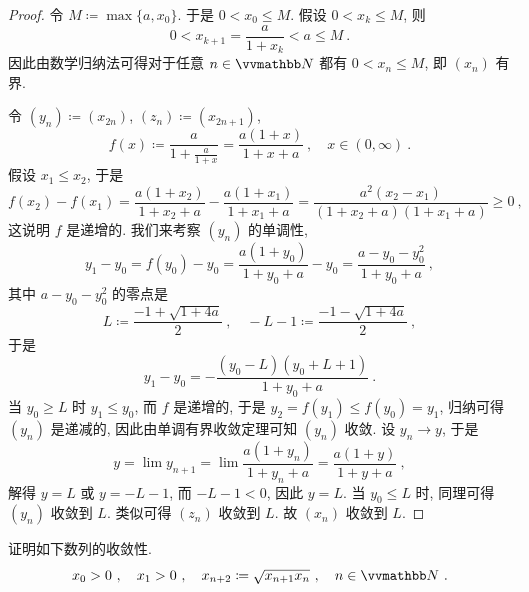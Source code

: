 \begin{proof}
    令 \(M \coloneqq \max\{a, x_0\}\). 于是 \(0 < x_0 \leq M\). 假设 \(0 < x_k \leq M\), 则
    \[
        0 < x_{k + 1} = \frac{a}{1 + x_k} < a \leq M\ .
    \]
    因此由数学归纳法可得对于任意 \(n \in \N\) 都有 \(0 < x_n \leq M\), 即 \((x_n)\) 有界.

    令 \((y_n) \coloneqq (x_{2 n})\), \((z_n) \coloneqq (x_{2 n + 1})\),
    \[
        f(x) \coloneqq \frac{a}{1 + \frac{a}{1 + x}} = \frac{a (1 + x)}{1 + x + a}\ ,\quad x \in (0, \infty)\ .
    \]
    假设 \(x_1 \leq x_2\), 于是
    \[
        f(x_2) - f(x_1) = \frac{a (1 + x_2)}{1 + x_2 + a} - \frac{a (1 + x_1)}{1 + x_1 + a} = \frac{a^2 (x_2 - x_1)}{(1 + x_2 + a) (1 + x_1 + a)} \geq 0\ ,
    \]
    这说明 \(f\) 是递增的. 我们来考察 \((y_n)\) 的单调性,
    \[
        y_1 - y_0 = f(y_0) - y_0 = \frac{a (1 + y_0)}{1 + y_0 + a} - y_0 = \frac{a - y_0 - y_0^2}{1 + y_0 + a}\ ,
    \]
    其中 \(a - y_0 - y_0^2\) 的零点是
    \[
        L \coloneqq \frac{- 1 + \sqrt{1 + 4 a}}{2}\ ,\quad - L - 1 \coloneqq \frac{- 1 - \sqrt{1 + 4 a}}{2}\ ,
    \]
    于是
    \[
        y_1 - y_0 = - \frac{(y_0 - L) (y_0 + L + 1)}{1 + y_0 + a}\ .
    \]
    当 \(y_0 \geq L\) 时 \(y_1 \leq y_0\), 而 \(f\) 是递增的, 于是 \(y_2 = f(y_1) \leq f(y_0) = y_1\), 归纳可得 \((y_n)\) 是递减的, 因此由单调有界收敛定理可知 \((y_n)\) 收敛. 设 \(y_n \to y\), 于是
    \[
        y = \lim y_{n + 1} = \lim \frac{a (1 + y_n)}{1 + y_n + a} = \frac{a (1 + y)}{1 + y + a}\ ,
    \]
    解得 \(y = L\) 或 \(y = - L - 1\), 而 \(- L - 1 < 0\), 因此 \(y = L\). 当 \(y_0 \leq L\) 时, 同理可得 \((y_n)\) 收敛到 \(L\). 类似可得 \((z_n)\) 收敛到 \(L\). 故 \((x_n)\) 收敛到 \(L\).
\end{proof}

\begin{exercise}
    证明如下数列的收敛性.
    \[
        x_0 > 0\ ,\quad x_1 > 0\ ,\quad x_{n + 2} \coloneqq \sqrt{x_{n + 1} x_n}\ ,\quad n \in \N\ .
    \]
\end{exercise}

